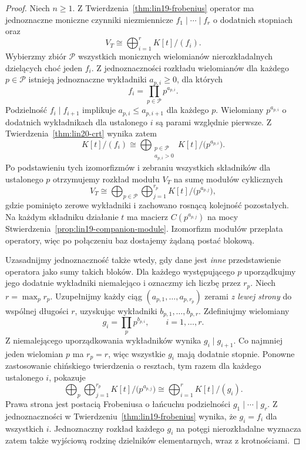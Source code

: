 \begin{proof}
Niech \(n\ge1\).
Z Twierdzenia~\ref{thm:lin19-frobenius}
operator ma jednoznaczne moniczne
czynniki niezmiennicze
\(f_1\mid\cdots\mid f_r\)
o dodatnich stopniach oraz
\[
 V_T\cong\bigoplus_{i=1}^{r}K[t]/(f_i).
\]
Wybierzmy zbiór \(\mathcal P\)
wszystkich monicznych wielomianów
nierozkładalnych dzielących choć jeden \(f_i\).
Z jednoznaczności rozkładu wielomianów
dla każdego \(p\in\mathcal P\)
istnieją jednoznaczne wykładniki
\(a_{p,i}\ge0\), dla których
\[
 f_i=\prod_{p\in\mathcal P}p^{a_{p,i}}.
\]
Podzielność \(f_i\mid f_{i+1}\)
implikuje
\(a_{p,i}\le a_{p,i+1}\) dla każdego \(p\).
Wielomiany \(p^{a_{p,i}}\)
o dodatnich wykładnikach dla ustalonego \(i\)
są parami względnie pierwsze.
Z Twierdzenia~\ref{thm:lin20-crt}
wynika zatem
\[
 K[t]/(f_i)\cong
 \bigoplus_{\substack{p\in\mathcal P\\a_{p,i}>0}}
 K[t]/\bigl(p^{a_{p,i}}\bigr).
\]
Po podstawieniu tych izomorfizmów
i zebraniu wszystkich składników
dla ustalonego \(p\)
otrzymujemy rozkład modułu \(V_T\)
na sumę modułów cyklicznych
\[
 V_T\cong\bigoplus_{p\in\mathcal P}
        \bigoplus_{j=1}^{r_p}
        K[t]/\bigl(p^{a_{p,j}}\bigr),
\]
gdzie pominięto zerowe wykładniki
i zachowano rosnącą kolejność pozostałych.
Na każdym składniku działanie \(t\)
ma macierz \(C(p^{a_{p,j}})\)
na mocy Stwierdzenia~\ref{prop:lin19-companion-module}.
Izomorfizm modułów przeplata operatory,
więc po połączeniu baz dostajemy
żądaną postać blokową.

Uzasadnijmy jednoznaczność także wtedy,
gdy dane jest \emph{inne} przedstawienie
operatora jako sumy takich bloków.
Dla każdego występującego \(p\)
uporządkujmy jego dodatnie wykładniki
niemalejąco i oznaczmy ich liczbę przez \(r_p\).
Niech \(r=\max_p r_p\).
Uzupełnijmy każdy ciąg
\((a_{p,1},\ldots,a_{p,r_p})\)
zerami \emph{z lewej strony}
do wspólnej długości \(r\),
uzyskując wykładniki \(b_{p,1},\ldots,b_{p,r}\).
Zdefiniujmy wielomiany
\[
 g_i=\prod_p p^{b_{p,i}},
 \qquad i=1,\ldots,r.
\]
Z niemalejącego uporządkowania wykładników
wynika \(g_i\mid g_{i+1}\).
Co najmniej jeden wielomian \(p\)
ma \(r_p=r\), więc wszystkie \(g_i\)
mają dodatnie stopnie.
Ponowne zastosowanie chińskiego
twierdzenia o resztach, tym razem
dla każdego ustalonego \(i\), pokazuje
\[
 \bigoplus_p\bigoplus_{j=1}^{r_p}
 K[t]/\bigl(p^{a_{p,j}}\bigr)
 \cong\bigoplus_{i=1}^{r}K[t]/(g_i).
\]
Prawa strona jest postacią Frobeniusa
o łańcuchu podzielności \(g_1\mid\cdots\mid g_r\).
Z jednoznaczności w
Twierdzeniu~\ref{thm:lin19-frobenius}
wynika, że \(g_i=f_i\) dla wszystkich \(i\).
Jednoznaczny rozkład każdego \(g_i\)
na potęgi nierozkładalne wyznacza
zatem także wyjściową rodzinę
dzielników elementarnych, wraz z krotnościami.


\end{proof}
